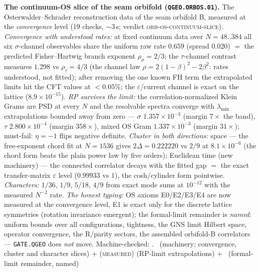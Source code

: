 \documentclass[11pt,a4paper]{article}
\theoremstyle{definition}
\begin{document}
\par\smallskip\noindent\textbf{The continuum-OS slice of the seam
orbifold (\texttt{QGEO.ORBOS.01}).}
The Osterwalder--Schrader reconstruction data of the seam orbifold B,
measured at the \emph{convergence} level ($19$ checks, ${\sim}3$\,s;
verdict \textsc{orb-os-continuum-slice}).  \emph{Convergence with
understood rates:} at fixed continuum data over $N=48..384$ all six
$\sigma$-channel observables share the uniform raw rate $0.659$
(spread $0.020$) $=$ the predicted Fisher--Hartwig branch exponent
$\rho_\sigma=2/3$; the $\tau$-channel contrast measures $1.298$ vs
$\rho_\tau=4/3$ (the channel law $\rho=2(1-\beta)^2-2\beta^2$: rates
understood, not fitted); after removing the one known FH term the
extrapolated limits hit the CFT values at $<0.05\%$; the
$\varepsilon$/current channel is exact on the lattice
($8.9\times10^{-15}$).  \emph{RP survives the limit:} the
correlation-normalized Klein Grams are PSD at every $N$ and the
resolvable spectra converge with $\lambda_{\min}$ extrapolations
bounded away from zero --- $\sigma$ $1.357\times10^{-3}$ (margin
$7\times$ the band), $\tau$ $2.800\times10^{-4}$ (margin $358\times$),
mixed OS Gram $1.337\times10^{-3}$ (margin $31\times$); must-fail:
$\eta=-1$ flips negative definite.  \emph{Cluster in both
directions:} space --- the free-exponent chord fit at $N=1536$ gives
$2\Delta=0.222220$ vs $2/9$ at $8.1\times10^{-6}$ (the chord form
beats the plain power law by five orders); Euclidean time (new
machinery) --- the connected correlator decays with the fitted gap
$=$ the exact transfer-matrix $\varepsilon$ level ($0.99933$ vs $1$),
the cosh/cylinder form pointwise.  \emph{Characters:} $1/36$, $1/9$,
$5/18$, $4/9$ from exact mode sums at $10^{-12}$ with the measured
$N^{-2}$ rate.  \emph{The honest typing:} OS axioms E0/E2/E3/E4 are
now measured at the convergence level, E1 is exact only for the
discrete lattice symmetries (rotation invariance emergent); the
formal-limit remainder is \emph{named}: uniform bounds over all
configurations, tightness, the GNS limit Hilbert space, operator
convergence, the R/parity sectors, the assembled orbifold-B
correlators --- \texttt{GATE.QGEO} does \emph{not} move.
Machine-checked: .
\mE\ (machinery; convergence, cluster and character slices) $+$
(\textsc{measured}) (RP-limit extrapolations) $+$ \mC\ (formal-limit
remainder, named)
\par\smallskip
\end{document}

